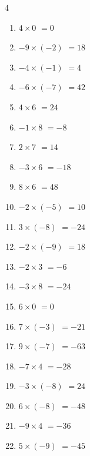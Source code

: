 \begin{multicols}{4}
\begin{enumerate}
  \item $4\times 0$
        $=0$

  \item $-9\times (-2)$
        $=18$

  \item $-4\times (-1)$
        $=4$

  \item $-6\times (-7)$
        $=42$

  \item $4\times 6$
        $=24$

  \item $-1\times 8$
        $=-8$

  \item $2\times 7$
        $=14$

  \item $-3\times 6$
        $=-18$

  \item $8\times 6$
        $=48$

  \item $-2\times (-5)$
        $=10$

  \item $3\times (-8)$
        $=-24$

  \item $-2\times (-9)$
        $=18$

\columnbreak %

  \item $-2\times 3$
        $=-6$

  \item $-3\times 8$
        $=-24$

  \item $6\times 0$
        $=0$

  \item $7\times (-3)$
        $=-21$

  \item $9\times (-7)$
        $=-63$

  \item $-7\times 4$
        $=-28$

  \item $-3\times (-8)$
        $=24$

  \item $6\times (-8)$
        $=-48$

  \item $-9\times 4$
        $=-36$

  \item $5\times (-9)$
        $=-45$


\end{enumerate}
\end{multicols}
